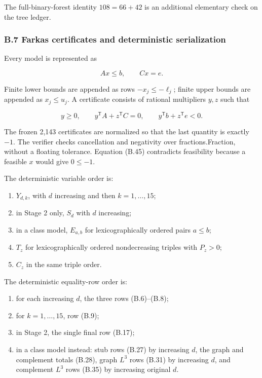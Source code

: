 \documentclass[
  english,
  11pt,
  a4paper,
]{article}
\providecommand{\tightlist}{%
  \setlength{\itemsep}{0pt}\setlength{\parskip}{0pt}}
\begin{document}
The full-binary-forest identity \(108=66+42\) is an additional
elementary check on the tree ledger.

\subsubsection{B.7 Farkas certificates and deterministic
serialization}\label{b.7-farkas-certificates-and-deterministic-serialization}

Every model is represented as

\[
Ax\le b,\qquad Cx=e.
\tag{B.44}
\]

Finite lower bounds are appended as rows \(-x_j\le-\ell_j\); finite
upper bounds are appended as \(x_j\le u_j\). A certificate consists of
rational multipliers \(y,z\) such that

\[
y\ge0,\qquad
y^{\mathsf T}A+z^{\mathsf T}C=0,\qquad
y^{\mathsf T}b+z^{\mathsf T}e<0.
\tag{B.45}
\]

The frozen 2,143 certificates are normalized so that the last quantity
is exactly \(-1\). The verifier checks cancellation and negativity over
fractions.Fraction, without a floating tolerance. Equation (B.45)
contradicts feasibility because a feasible \(x\) would give \(0\le-1\).

The deterministic variable order is:

\begin{enumerate}
\def\labelenumi{\arabic{enumi}.}
\tightlist
\item
  \(Y_{d,k}\), with \(d\) increasing and then \(k=1,\ldots,15\);
\item
  in Stage 2 only, \(S_d\) with \(d\) increasing;
\item
  in a class model, \(E_{a,b}\) for lexicographically ordered pairs
  \(a\le b\);
\item
  \(T_z\) for lexicographically ordered nondecreasing triples with
  \(P_z>0\);
\item
  \(C_z\) in the same triple order.
\end{enumerate}

The deterministic equality-row order is:

\begin{enumerate}
\def\labelenumi{\arabic{enumi}.}
\tightlist
\item
  for each increasing \(d\), the three rows (B.6)--(B.8);
\item
  for \(k=1,\ldots,15\), row (B.9);
\item
  in Stage 2, the single final row (B.17);
\item
  in a class model instead: stub rows (B.27) by increasing \(d\), the
  graph and complement totals (B.28), graph \(L^3\) rows (B.31) by
  increasing \(d\), and complement \(L^3\) rows (B.35) by increasing
  original \(d\).
\end{enumerate}
\end{document}
